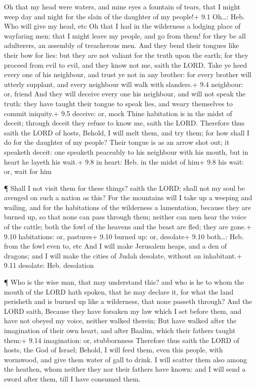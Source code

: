  Oh that my head were waters, and mine eyes a fountain of
tears, that I might weep day and night for the slain of the daughter of
my people!+ 9.1 Oh\ldots: Heb. Who will give my head, etc 
Oh that I had in the wilderness a lodging place of wayfaring men; that I
might leave my people, and go from them! for they be all adulterers, an
assembly of treacherous men.  And they bend their tongues
like their bow for lies: but they are not valiant for the truth upon the
earth; for they proceed from evil to evil, and they know not me, saith
the LORD.  Take ye heed every one of his neighbour, and
trust ye not in any brother: for every brother will utterly supplant,
and every neighbour will walk with slanders.+ 9.4 neighbour: or, friend
 And they will deceive every one his neighbour, and will not
speak the truth: they have taught their tongue to speak lies, and weary
themselves to commit iniquity.+ 9.5 deceive: or, mock  Thine
habitation is in the midst of deceit; through deceit they refuse to know
me, saith the LORD.  Therefore thus saith the LORD of hosts,
Behold, I will melt them, and try them; for how shall I do for the
daughter of my people?  Their tongue is as an arrow shot
out; it speaketh deceit: one speaketh peaceably to his neighbour with
his mouth, but in heart he layeth his wait.+ 9.8 in heart: Heb. in the
midst of him+ 9.8 his wait: or, wait for him

 ¶ Shall I not visit them for these things? saith the LORD:
shall not my soul be avenged on such a nation as this?  For
the mountains will I take up a weeping and wailing, and for the
habitations of the wilderness a lamentation, because they are burned up,
so that none can pass through them; neither can men hear the voice of
the cattle; both the fowl of the heavens and the beast are fled; they
are gone.+ 9.10 habitations: or, pastures+ 9.10 burned up: or, desolate+
9.10 both\ldots: Heb. from the fowl even to, etc  And I
will make Jerusalem heaps, and a den of dragons; and I will make the
cities of Judah desolate, without an inhabitant.+ 9.11 desolate: Heb.
desolation

 ¶ Who is the wise man, that may understand this? and who
is he to whom the mouth of the LORD hath spoken, that he may declare it,
for what the land perisheth and is burned up like a wilderness, that
none passeth through?  And the LORD saith, Because they
have forsaken my law which I set before them, and have not obeyed my
voice, neither walked therein;  But have walked after the
imagination of their own heart, and after Baalim, which their fathers
taught them:+ 9.14 imagination: or, stubbornness  Therefore
thus saith the LORD of hosts, the God of Israel; Behold, I will feed
them, even this people, with wormwood, and give them water of gall to
drink.  I will scatter them also among the heathen, whom
neither they nor their fathers have known: and I will send a sword after
them, till I have consumed them.

